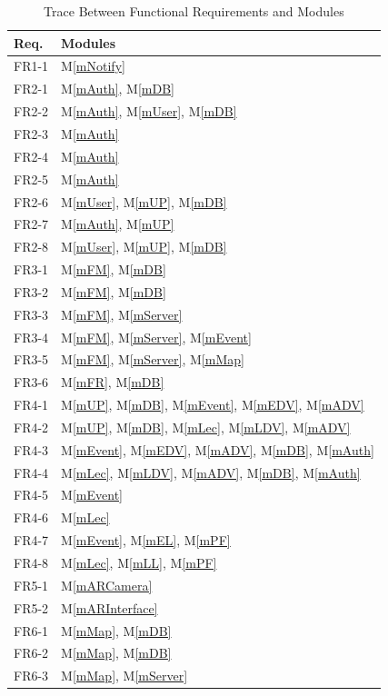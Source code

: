 \documentclass[12pt, titlepage]{article}
\newcommand{\mref}[1]{M\ref{#1}}
\begin{document}
\begin{table}[H]
\centering
\begin{tabular}{p{} p{}}
\toprule
\textbf{Req.} & \textbf{Modules}\\
\midrule
FR1-1 & \mref{mNotify}\\
FR2-1 & \mref{mAuth}, \mref{mDB}\\
FR2-2 & \mref{mAuth}, \mref{mUser}, \mref{mDB}\\
FR2-3 & \mref{mAuth}\\
FR2-4 & \mref{mAuth}\\
FR2-5 & \mref{mAuth}\\
FR2-6 & \mref{mUser}, \mref{mUP}, \mref{mDB}\\
FR2-7 & \mref{mAuth}, \mref{mUP}\\
FR2-8 & \mref{mUser}, \mref{mUP}, \mref{mDB}\\
FR3-1 & \mref{mFM}, \mref{mDB}\\
FR3-2 & \mref{mFM}, \mref{mDB}\\
FR3-3 & \mref{mFM}, \mref{mServer}\\
FR3-4 & \mref{mFM}, \mref{mServer}, \mref{mEvent}\\
FR3-5 & \mref{mFM}, \mref{mServer}, \mref{mMap}\\
FR3-6 & \mref{mFR}, \mref{mDB}\\
FR4-1 & \mref{mUP}, \mref{mDB}, \mref{mEvent}, \mref{mEDV}, \mref{mADV}\\
FR4-2 & \mref{mUP}, \mref{mDB}, \mref{mLec}, \mref{mLDV}, \mref{mADV}\\
FR4-3 & \mref{mEvent}, \mref{mEDV}, \mref{mADV}, \mref{mDB}, \mref{mAuth}\\
FR4-4 & \mref{mLec}, \mref{mLDV}, \mref{mADV}, \mref{mDB}, \mref{mAuth}\\
FR4-5 & \mref{mEvent}\\
FR4-6 & \mref{mLec}\\
FR4-7 & \mref{mEvent}, \mref{mEL}, \mref{mPF}\\
FR4-8 & \mref{mLec}, \mref{mLL}, \mref{mPF}\\
FR5-1 & \mref{mARCamera}\\
FR5-2 & \mref{mARInterface}\\
FR6-1 & \mref{mMap}, \mref{mDB}\\
FR6-2 & \mref{mMap}, \mref{mDB}\\
FR6-3 & \mref{mMap}, \mref{mServer}\\
\bottomrule
\end{tabular}
\caption{Trace Between Functional Requirements and Modules}
\label{TblFRT}
\end{table}
\end{document}
